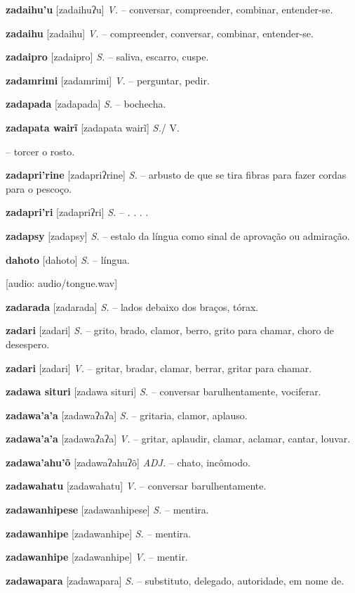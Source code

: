 {{{{{{\textbf{zadaihu'u} [zadaihuʔu] \textit{V.} -- conversar, compreender, combinar, entender-se.

\textbf{zadaihu} [zadaihu] \textit{V.} -- compreender, conversar, combinar, entender-se.

\textbf{zadaipro} [zadaipro] \textit{S.} -- saliva, escarro, cuspe.

\textbf{zadamrimi} [zadamrimi] \textit{V.} -- perguntar, pedir.

\textbf{zadapada} [zadapada] \textit{S.} -- bochecha.

\textbf{zadapata wairĩ} [zadapata wairĩ] \textit{S.}/ V.} -- torcer o rosto.

\textbf{zadapri'rine} [zadapriʔrine] \textit{S.} -- arbusto de que se tira fibras para fazer cordas para o pescoço.

\textbf{zadapri'ri} [zadapriʔri] \textit{S.} -- . . . .

\textbf{zadapsy} [zadapsy] \textit{S.} -- estalo da língua como sinal de aprovação ou admiração.

\textbf{dahoto} [dahoto] \textit{S.} -- língua.} [audio: audio/tongue.wav]

\textbf{zadarada} [zadarada] \textit{S.} -- lados debaixo dos braços, tórax.

\textbf{zadari} [zadari] \textit{S.} -- grito, brado, clamor, berro, grito para chamar, choro de desespero.

\textbf{zadari} [zadari] \textit{V.} -- gritar, bradar, clamar, berrar, gritar para chamar.

\textbf{zadawa situri} [zadawa situri] \textit{S.} -- conversar barulhentamente, vociferar.

\textbf{zadawa'a'a} [zadawaʔaʔa] \textit{S.} -- gritaria, clamor, aplauso.

\textbf{zadawa'a'a} [zadawaʔaʔa] \textit{V.} -- gritar, aplaudir, clamar, aclamar, cantar, louvar.

\textbf{zadawa'ahu'õ} [zadawaʔahuʔõ] \textit{ADJ.} -- chato, incômodo.

\textbf{zadawahatu} [zadawahatu] \textit{V.} -- conversar barulhentamente.

\textbf{zadawanhipese} [zadawanhipese] \textit{S.} -- mentira.

\textbf{zadawanhipe} [zadawanhipe] \textit{S.} -- mentira.

\textbf{zadawanhipe} [zadawanhipe] \textit{V.} -- mentir.

\textbf{zadawapara} [zadawapara] \textit{S.} -- substituto, delegado, autoridade, em nome de.

}}}}
